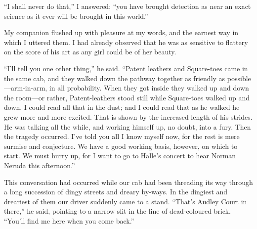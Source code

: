 \documentclass[12pt,english,oneside]{book}
\newcommand{\mdsh}[1]{\mbox{#1}\linebreak[1]}
\begin{document}
{}``I shall never do that,'' I answered; {}``you have brought detection
as near an exact science as it ever will be brought in this world.''

My companion flushed up with pleasure at my words, and the earnest
way in which I uttered them. I had already observed that he was as
sensitive to flattery on the score of his art as any girl could be
of her beauty.

{}``I'll tell you one other thing,'' he said. {}``Patent leathers
and Square-toes came in the same cab, and they walked down the pathway
together as friendly as possible\mdsh{---}arm-in-arm, in all probability.
When they got inside they walked up and down the room\mdsh{---}or
rather, Patent-leathers stood still while Square-toes walked up and
down. I could read all that in the dust; and I could read that as
he walked he grew more and more excited. That is shown by the increased
length of his strides. He was talking all the while, and working himself
up, no doubt, into a fury. Then the tragedy occurred. I've told you
all I know myself now, for the rest is mere surmise and conjecture.
We have a good working basis, however, on which to start. We must
hurry up, for I want to go to Halle's concert to hear Norman Neruda
this afternoon.''

This conversation had occurred while our cab had been threading its
way through a long succession of dingy streets and dreary by-ways.
In the dingiest and dreariest of them our driver suddenly came to
a stand. {}``That's Audley Court in there,'' he said, pointing to
a narrow slit in the line of dead-coloured brick. {}``You'll find
me here when you come back.''
\end{document}
